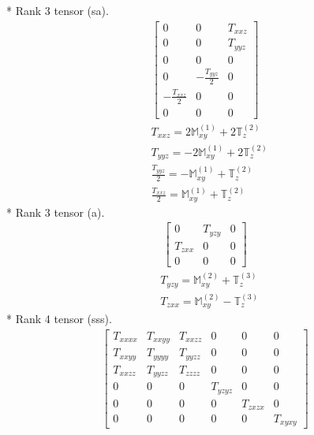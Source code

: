 \documentclass[fleqn,8pt,landscape]{jsarticle}
\begin{document}
* Rank 3 tensor (sa).
\begin{align*}
\begin{bmatrix} 0 & 0 & T_{xxz} \\ 0 & 0 & T_{yyz} \\ 0 & 0 & 0 \\ 0 & - \frac{T_{yyz}}{2} & 0 \\ - \frac{T_{xxz}}{2} & 0 & 0 \\ 0 & 0 & 0 \end{bmatrix}
\end{align*}
\begin{align*}
& T_{xxz} = 2 \mathbb{M}_{xy}^{(1)} + 2 \mathbb{T}_{z}^{(2)} \\
& T_{yyz} = - 2 \mathbb{M}_{xy}^{(1)} + 2 \mathbb{T}_{z}^{(2)} \\
& \frac{T_{yyz}}{2} = - \mathbb{M}_{xy}^{(1)} + \mathbb{T}_{z}^{(2)} \\
& \frac{T_{xxz}}{2} = \mathbb{M}_{xy}^{(1)} + \mathbb{T}_{z}^{(2)}
\end{align*}
* Rank 3 tensor (a).
\begin{align*}
\begin{bmatrix} 0 & T_{yzy} & 0 \\ T_{zxx} & 0 & 0 \\ 0 & 0 & 0 \end{bmatrix}
\end{align*}
\begin{align*}
& T_{yzy} = \mathbb{M}_{xy}^{(2)} + \mathbb{T}_{z}^{(3)} \\
& T_{zxx} = \mathbb{M}_{xy}^{(2)} - \mathbb{T}_{z}^{(3)}
\end{align*}
* Rank 4 tensor (sss).
\begin{align*}
\begin{bmatrix} T_{xxxx} & T_{xxyy} & T_{xxzz} & 0 & 0 & 0 \\ T_{xxyy} & T_{yyyy} & T_{yyzz} & 0 & 0 & 0 \\ T_{xxzz} & T_{yyzz} & T_{zzzz} & 0 & 0 & 0 \\ 0 & 0 & 0 & T_{yzyz} & 0 & 0 \\ 0 & 0 & 0 & 0 & T_{zxzx} & 0 \\ 0 & 0 & 0 & 0 & 0 & T_{xyxy} \end{bmatrix}
\end{align*}
\end{document}
